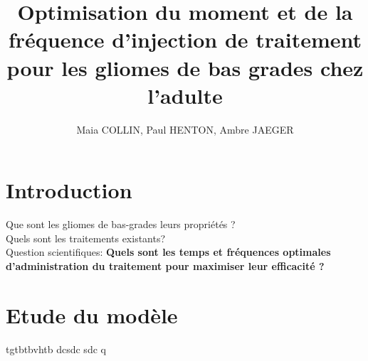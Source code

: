 \documentclass[12pt]{article}
\title{Optimisation du moment et de la fréquence d'injection de traitement pour les gliomes de bas grades chez l'adulte} %
\author{Maia COLLIN, Paul HENTON, Ambre JAEGER} %
\begin{document}
\maketitle %
     
\section{Introduction}
Que sont les gliomes de bas-grades leurs propriétés ?\\
Quels sont les traitements existants?\\
Question scientifiques: \textbf{Quels sont les temps et fréquences optimales d'administration du traitement pour maximiser leur efficacité ?}


\section{Etude du modèle}
tgtbtbvhtb dcsdc sdc q
\end{document}
